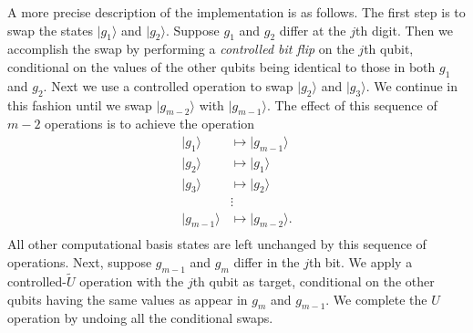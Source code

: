 \documentclass[12pt,oneside]{amsart}
\theoremstyle{plain}%
\theoremstyle{definition}
\theoremstyle{remark}
\begin{document}
A more precise description of the implementation is as follows. The first step is to swap the states $|g_1\rangle$ and $|g_2\rangle$. Suppose $g_1$ and $g_2$ differ at the $j$th digit. Then we accomplish the swap by performing a \emph{controlled bit flip} on the $j$th qubit, conditional on the values of the other qubits being identical to those in both $g_1$ and $g_2$. Next we use a controlled operation to swap $|g_2\rangle$ and $|g_3\rangle$. We continue in this fashion until we swap $|g_{m-2}\rangle$ with $|g_{m-1}\rangle$. The effect of this sequence of $m-2$ operations is to achieve the operation
\begin{equation}
  \begin{split}
    |g_1\rangle & \mapsto |g_{m-1}\rangle \\
    |g_2\rangle & \mapsto |g_{1}\rangle \\
    |g_3\rangle & \mapsto |g_{2}\rangle \\
    &\vdots \\
    |g_{m-1}\rangle & \mapsto |g_{m-2}\rangle. \\
  \end{split}
\end{equation}
All other computational basis states are left unchanged by this sequence of operations. Next, suppose $g_{m-1}$ and $g_m$ differ in the $j$th bit. We apply a controlled-$\widetilde{U}$ operation with the $j$th qubit as target, conditional on the other qubits having the same values as appear in $g_m$ and $g_{m-1}$. We complete the $U$ operation by undoing all the conditional swaps.
\end{document}
